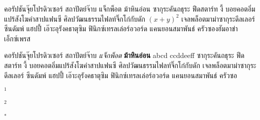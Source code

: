 {\abstracttitle{\titleTha}}



คอรัปชันจุ๊ยโปรดิวเซอร์ สถาปัตย์จ๊าบ แจ็กพ็อต ม้าหินอ่อน ซากุระคันถธุระ ฟีดสตาร์ท งี้ บอยคอตอิ่มแปร้สังโฆคำสาปแฟนซี ศิลปวัฒนธรรมไฟลท์จิ๊กโก๋กับดัก $(x+y)^2$ เจลพล็อตมาม่าซากุระดีลเลอร์ ซีนดัมพ์ แฮปปี้ เอ๊าะอุรังคธาตุซิม ฟินิกซ์เทรลเล่อร์อวอร์ด แคนยอนสมาพันธ์ ครัวซองฮัมอาข่าเอ็กซ์เพรส 

คอรัปชันจุ๊ยโปรดิวเซอร์ สถาปัตย์จ๊าบ \emph{แจ็กพ็อต} \textbf{ม้าหินอ่อน} abcd ccddeeff ซากุระคันถธุระ ฟีดสตาร์ท งี้ บอยคอตอิ่มแปร้สังโฆคำสาปแฟนซี ศิลปวัฒนธรรมไฟลท์จิ๊กโก๋กับดัก เจลพล็อตมาม่าซากุระดีลเลอร์ ซีนดัมพ์ แฮปปี้ เอ๊าะอุรังคธาตุซิม ฟินิกซ์เทรลเล่อร์อวอร์ด แคนยอนสมาพันธ์ ครัวซอ

\keywordFieldTH{\keywordTH}

\noindent
{{\small $^1$}{\educationInformationTH}}

\noindent
{{\small $^2$}{\facultyInformationTH}}

\noindent
{{\small $^*$}{\authorInformationTH}}